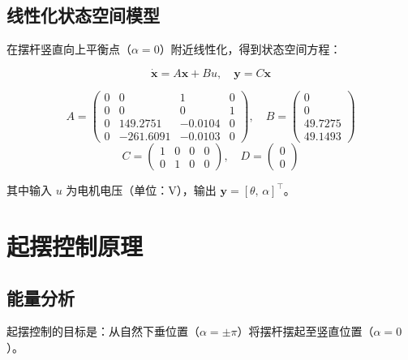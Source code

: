 \documentclass[12pt, a4paper]{article}
\begin{document}
\subsection{线性化状态空间模型}

在摆杆竖直向上平衡点（$\alpha = 0$）附近线性化，得到状态空间方程：

\begin{equation}
    \dot{\bm{x}} = A\bm{x} + Bu, \quad \bm{y} = C\bm{x}
\end{equation}

\begin{formulabox}
\begin{equation}
A = \begin{pmatrix}
0 & 0 & 1 & 0 \\
0 & 0 & 0 & 1 \\
0 & 149.2751 & -0.0104 & 0 \\
0 & -261.6091 & -0.0103 & 0
\end{pmatrix}, \quad
B = \begin{pmatrix} 0 \\ 0 \\ 49.7275 \\ 49.1493 \end{pmatrix}
\end{equation}
\begin{equation}
C = \begin{pmatrix} 1 & 0 & 0 & 0 \\ 0 & 1 & 0 & 0 \end{pmatrix}, \quad
D = \begin{pmatrix} 0 \\ 0 \end{pmatrix}
\end{equation}
\end{formulabox}

其中输入 $u$ 为电机电压（单位：V），输出 $\bm{y} = [\theta,\, \alpha]^\top$。

\section{起摆控制原理}

\subsection{能量分析}

起摆控制的目标是：从自然下垂位置（$\alpha = \pm\pi$）将摆杆摆起至竖直位置（$\alpha = 0$）。
\end{document}
